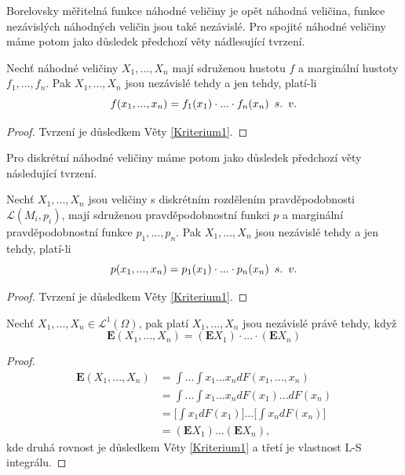 Borelovsky měřitelná funkce náhodné veličiny je opět náhodná veličina, funkce nezávislých náhodných veličin jsou také nezávislé. Pro spojité náhodné veličiny máme potom jako důsledek předchozí věty nádlesující tvrzení.
\begin{theorem}
Nechť náhodné veličiny $X_{1}, ..., X_{n}$ mají sdruženou hustotu $f$ a marginální hustoty $f_{1}, ..., f_{n}$. Pak $X_{1}, ..., X_{n}$ jsou nezávislé tehdy a jen tehdy, platí-li
\begin{equation}
f(x_{1}, ..., x_{n}) = f_{1}(x_{1})\cdot ... \cdot f_{n}(x_{n}) \enskip s. \enskip v.
\end{equation}
\end{theorem}
\begin{proof}
Tvrzení je důsledkem Věty \ref{Kriterium1}.
\end{proof}

Pro diskrétní náhodné veličiny máme potom jako důsledek předchozí věty následující tvrzení.
\begin{theorem}
Nechť $X_{1}, ..., X_{n}$ jsou veličiny s diskrétním rozdělením pravděpodobnosti $\mathcal{L}(M_{i}, p_{i})$, mají sdruženou pravděpodobnostní funkci $p$ a marginální pravděpodobnostní funkce $p_{1}, ..., p_{n}$. Pak $X_{1}, ..., X_{n}$ jsou nezávislé tehdy a jen tehdy, platí-li
\begin{equation}
p(x_{1}, ..., x_{n}) = p_{1}(x_{1})\cdot ... \cdot p_{n}(x_{n}) \enskip s. \enskip v.
\end{equation}
\end{theorem}
\begin{proof}
Tvrzení je důsledkem Věty \ref{Kriterium1}.
\end{proof}

\begin{theorem}\label{VetaSeStrHod}
Nechť $X_{1}, ..., X_{n} \in \mathcal{L}^{1}(\Omega)$, pak platí $X_{1}, ..., X_{n}$ jsou nezávislé právě tehdy, když
\begin{equation}
\mathbf{E}(X_{1}, ..., X_{n}) = (\mathbf{E}X_{1}) \cdot ... \cdot (\mathbf{E}X_{n}) 
\end{equation}
\end{theorem}
\begin{proof}
\begin{align*}
\mathbf{E}(X_{1}, ..., X_{n})&= \int ... \int x_{1}...x_{n}dF(x_{1}, ..., x_{n}) \\
&= \int ... \int x_{1}...x_{n}dF(x_{1})...dF(x_{n}) \\
&= \bigg[ \int x_{1}dF(x_{1}) \bigg]...\bigg[ \int x_{n}dF(x_{n}) \bigg]\\ 
&= (\mathbf{E}X_{1})  ... (\mathbf{E}X_{n}),
\end{align*}
kde druhá rovnost je důsledkem Věty \ref{Kriterium1} a třetí je vlastnost L-S integrálu.
\end{proof}

